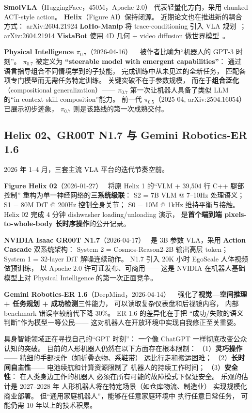 \textbf{SmolVLA}（HuggingFace，450M，Apache 2.0）
代表轻量化方向，采用 chunked ACT-style action。
\textbf{Helix}（Figure AI）保持闭源。
近期论文也在推进新的耦合方式：
arXiv:2604.21924 \textbf{LoHo-Manip} 将 trace-conditioning 引入 VLA 规划~\cite{loho_manip_2026}；
arXiv:2604.21914 \textbf{VistaBot} 使用 4D 几何 + video diffusion 做世界模型~\cite{vistabot_2026}。

\textbf{Physical Intelligence \texorpdfstring{$\pi_{0.7}$}{pi-0.7}}（2026-04-16）%
~\cite{pi07_2026}
被作者比喻为“机器人的 GPT-3 时刻”。
$\pi_{0.7}$ 被定义为
\textbf{“steerable model with emergent capabilities”}：
通过语言指导组合不同情境学到的子技能，
完成训练中从未见过的全新任务，
匹配各项专门模型而无需任务特定训练。
关键突破不在于参数规模，
而在于\textbf{组合泛化}（compositional generalization）——
$\pi_{0.7}$ 第一次让机器人具备了类似 LLM 的“in-context skill composition”能力。
前一代 $\pi_{0.5}$（2025-04, arXiv:2504.16054）已展示初步迹象，
$\pi_{0.7}$ 则是该路线的第一次成熟交付。

\subsection{Helix 02、GR00T N1.7 与 Gemini Robotics-ER 1.6}

2026 年 1--4 月，三套主流 VLA 平台的迭代节奏空前。

\textbf{Figure Helix 02}（2026-01-27）~\cite{figure_helix02_2026}
将原 Helix 1 的“VLM + 39,504 行 C++ 腿部控制”
重构为单一神经网络的\textbf{三系统级联}：
S2 = 7B VLM @ 7--10Hz 处理语义；
S1 = 80M DiT @ 200Hz 控制全身关节；
S0 = 10M @ 1kHz 维持平衡与接触。
Helix 02 完成 4 分钟 dishwasher loading/unloading 演示，
是\textbf{首个端到端 pixels-to-whole-body 长时序操作}的公开记录。

\textbf{NVIDIA Isaac GR00T N1.7}（2026-04-17）~\cite{groot_n17_2026}
是 3B 参数 VLA，采用 \textbf{Action Cascade} 双系统架构：
System 2 = Cosmos-Reason2-2B 输出高层 token；
System 1 = 32-layer DiT 解噪连续动作。
N1.7 引入 20K 小时 EgoScale 人体视频做预训练，
以 Apache 2.0 许可证发布、可商用——
这是 NVIDIA 在机器人基础模型上对 Physical Intelligence 的第一次正面竞争。

\textbf{Gemini Robotics-ER 1.6}（DeepMind，2026-04-14）%
~\cite{gemini_robotics_er16_2026}
强化了\textbf{视觉—空间推理 + 任务规划 + 成功检测}三件能力，
可以读取复杂仪表盘和后视镜内容，
内部 benchmark 错误率较前代下降 30\%。
ER 1.6 的差异化在于把
“成功/失败的语义判断”作为模型一等公民——
这对机器人在开放环境中实现自我修正至关重要。

\begin{corebox}
具身智能领域正在寻找自己的“GPT 时刻”：
一个像 ChatGPT 一样彻底改变公众认知的突破。
目前的人形机器人仍然在以下方面存在根本限制：
（1）\textbf{灵巧操作}——
精细的手部操作（如折叠衣物、系鞋带）
远比行走和搬运困难；
（2）\textbf{长时间自主性}——
电池续航和计算资源限制了
机器人的持续工作时间；
（3）\textbf{安全性}：
在人类身边工作的机器人
必须在所有可能的故障模式下保证安全。
乐观的估计是 2027--2028 年
人形机器人将在特定场景（如仓库物流、制造业）
实现规模化商业部署。
但“通用家庭机器人”，能够在任意家庭环境中
执行任意日常任务，
可能仍需 10 年以上的技术积累。
\end{corebox}


